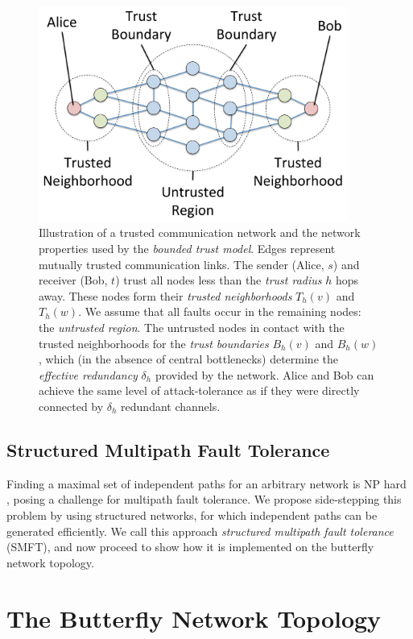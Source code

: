 \documentclass[10pt,letterpaper]{article}
\begin{document}
\begin{figure}
\centerline{\includegraphics[width=4in,height=2.78in]{fig-partial-trust.pdf}}
\caption{
Illustration of a trusted communication network and the network properties
used by the {\em bounded trust model}.
Edges represent mutually trusted communication links.
The sender (Alice, $s$) and receiver (Bob, $t$) trust all nodes
less than the {\em trust radius} $h$ hops away.
These nodes form their {\em trusted neighborhoods} $T_h(v)$ and $T_h(w)$.
We assume that all faults occur in the remaining nodes: the
{\em untrusted region}.
The untrusted nodes in contact with the trusted neighborhoods for the
{\em trust boundaries} $B_h(v)$ and $B_h(w)$,
which (in the absence of central bottlenecks) determine the
{\em effective redundancy} $\delta_h$ provided by the network.
Alice and Bob can achieve the same level of attack-tolerance
as if they were directly connected by $\delta_h$ redundant channels.
}
\label{fig:trust-source}
\end{figure}

\subsection*{Structured Multipath Fault Tolerance}

Finding a maximal set of independent paths for an arbitrary network is NP hard
\cite{reiter_resilient_1998},
posing a challenge for multipath fault tolerance.
We propose side-stepping this problem by using structured networks,
for which independent paths can be generated efficiently.
We call this approach {\em structured multipath fault tolerance} (SMFT),
and now proceed to show how it is implemented on the butterfly
network topology.

\section*{The Butterfly Network Topology}
\label{sec-butterfly}
\end{document}
